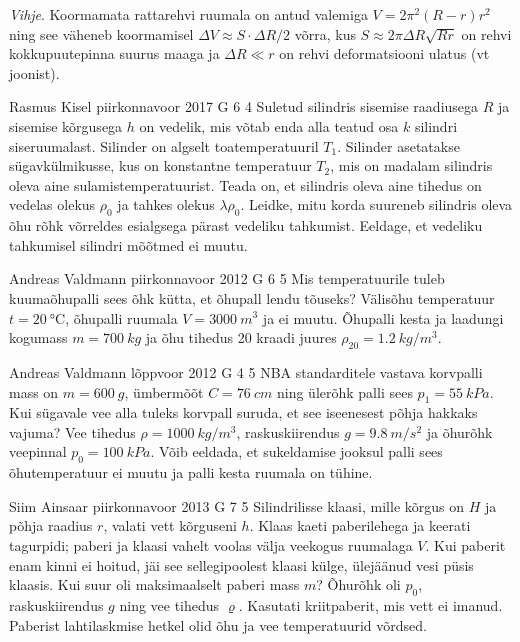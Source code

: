 \documentclass[11pt, twoside]{article}
\begin{document}
{{\textit{Vihje}. Koormamata rattarehvi ruumala on antud valemiga $V=2\pi^{2}\left(R-r\right)r^{2}$
ning see väheneb koormamisel $\Delta V\approx S\cdot\Delta R/2$ võrra,
kus $S\approx2\pi\Delta R\sqrt{Rr}$ on rehvi kokkupuutepinna suurus
maaga ja $\Delta R\ll r$ on rehvi deformatsiooni ulatus (vt joonist).
\fi
}

{Rasmus Kisel} %
{piirkonnavoor} %
{2017} %
{G 6} %
{4} %
{
\ifStatement
Suletud silindris sisemise raadiusega $R$ ja sisemise kõrgusega $h$ on vedelik, mis võtab enda alla teatud osa $k$ silindri siseruumalast. Silinder on algselt toatemperatuuril $T_{1}$. Silinder asetatakse sügavkülmikusse, kus on konstantne temperatuur $T_{2}$, mis on madalam silindris oleva aine sulamistemperatuurist. Teada on, et silindris oleva aine tihedus on vedelas olekus $\rho_0$ ja tahkes olekus $\lambda\rho_0$. Leidke, mitu korda suureneb silindris oleva õhu rõhk võrreldes esialgsega pärast vedeliku tahkumist. Eeldage, et vedeliku tahkumisel silindri mõõtmed ei muutu.
\fi
}

{Andreas Valdmann} %
{piirkonnavoor} %
{2012} %
{G 6} %
{5} %
{
\ifStatement
Mis temperatuurile tuleb kuumaõhupalli sees õhk kütta, et õhupall lendu tõuseks?
Välisõhu temperatuur $t=\SI{20}{\celsius}$, õhupalli ruumala $V=\SI{3000}{m^3}$ ja ei
muutu. Õhupalli kesta ja laadungi kogumass $m=\SI{700}{kg}$ ja õhu tihedus
20 kraadi juures $\rho_{20}=\SI{1,2}{kg/m^3}$.
\fi
}

{Andreas Valdmann} %
{lõppvoor} %
{2012} %
{G 4} %
{5} %
{
\ifStatement
NBA standarditele vastava korvpalli mass on $m=\SI{600}{g}$, ümbermõõt
$C=\SI{76}{cm}$ ning ülerõhk palli sees $p_1=\SI{55}{kPa}$. Kui sügavale vee
alla tuleks korvpall suruda, et see iseenesest põhja hakkaks vajuma? Vee tihedus
$\rho=\SI{1000}{kg/m^3}$, raskuskiirendus $g=\SI{9,8}{m/s^2}$ ja õhurõhk
veepinnal $p_0=\SI{100}{kPa}$. Võib eeldada, et sukeldamise jooksul palli sees
õhutemperatuur ei muutu ja palli kesta ruumala on tühine.
\fi
}

{Siim Ainsaar} %
{piirkonnavoor} %
{2013} %
{G 7} %
{5} %
{
\ifStatement
Silindrilisse klaasi, mille kõrgus on $H$ ja põhja raadius $r$, valati
vett kõrguseni $h$. Klaas kaeti paberilehega ja keerati
tagurpidi; paberi ja
klaasi vahelt voolas välja veekogus ruumalaga $V$. Kui paberit enam kinni ei
hoitud, jäi see sellegipoolest klaasi külge, ülejäänud vesi püsis klaasis.
Kui suur oli maksimaalselt paberi mass $m$? Õhurõhk oli $p_0$,
raskuskiirendus $g$ ning vee tihedus $\varrho$.
Kasutati kriitpaberit, mis vett ei imanud. Paberist lahtilaskmise hetkel olid 
õhu ja vee temperatuurid võrdsed.
\fi
}

}
\end{document}

